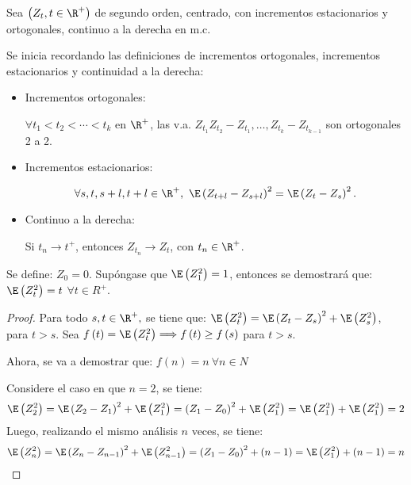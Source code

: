 \begin{ejemplo}
Sea $\left( Z_{t},t\in \R^{+} \right)$ de segundo orden, centrado, con incrementos estacionarios y ortogonales, continuo a la derecha en m.c. 

Se inicia recordando las definiciones de incrementos ortogonales, incrementos estacionarios y continuidad a la derecha:

\begin{itemize}
\item Incrementos ortogonales:\newline

$\forall t_{1}<t_{2}<\cdots <t_{k}$ en $\R^{+}$, las v.a. $Z_{t_{1}}Z_{t_{2}}-Z_{t_{1}},\ldots,Z_{t_{k}}-Z_{t_{k-1}}$ 
son ortogonales 2 a 2.

\item Incrementos estacionarios: 

\[
\forall  s,t,s+l,t+l \in \R^{+},\ \E\left(Z_{t+l}-Z_{s+l} \right)^{2}=\E\left( Z_{t}-Z_{s} \right)^{2}.
\]

\item Continuo a la derecha:\newline

Si $t_{n}\to t^{+}$, entonces $Z_{t_{n}}\to Z_{t}$, con $t_{n}\in\R^{+}$.

\end{itemize}

\begin{itemize}
\item Se define: $Z_{0}=0$. Sup\'{o}ngase que $\E\left( Z_{1}^{2} \right)=1$, entonces se demostrar\'{a} que: $\E\left( Z_{t}^{2} \right)=t$ $\forall t\in R^{+}$.

\begin{proof} 
Para todo $s,t \in \R^{+},$ se tiene que: $\E\left( Z_{t}^{2} \right)=\E\left( Z_{t}-Z_{s} \right)^{2}+\E\left( Z_{s}^{2} \right)$, para $t>s$. Sea $f\left( t \right)=\E\left( Z_{t}^{2} \right)\Longrightarrow f\left( t \right)\geq f\left( s \right)$ para $t>s$.

\item Ahora, se va a demostrar que: $f\left( n \right)=n\ \forall n\in N$

Considere el caso en que $n=2$, se tiene:
\[
\E\left( Z_{2}^{2} \right)=\E\left( Z_{2}-Z_{1} \right)^{2}+\E\left( Z_{1}^{2} 
\right)=\left( Z_{1}-Z_{0} \right)^{2}+\E\left( Z_{1}^{2} \right)=\E\left( 
Z_{1}^{2} \right)+\E\left( Z_{1}^{2} \right)=2
\]
Luego, realizando el mismo an\'{a}lisis $n$ veces, se tiene:
\[
\E\left( Z_{n}^{2} \right)=\E\left( Z_{n}-Z_{n-1} \right)^{2}+\E\left( 
Z_{n-1}^{2} \right)=\left( Z_{1}-Z_{0} \right)^{2}+\left( n-1 
\right)=\E\left( Z_{1}^{2} \right)+\left( n-1 \right)=n
\]


\end{proof}
\end{itemize}
\end{ejemplo}
